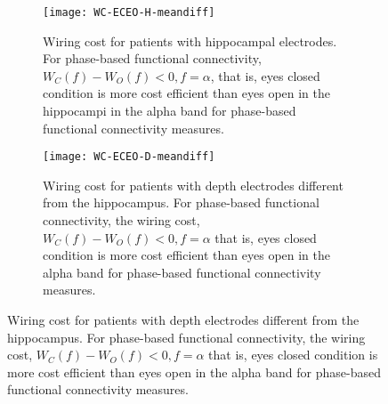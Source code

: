 \documentclass[11pt, onecolumn]{article}
\begin{document}
\begin{figure}[h] 
  \begin{subfigure}[t]{0.5\linewidth}
    \centering
    \texttt{[image: WC-ECEO-H-meandiff]} 
    \caption{Wiring cost for patients with hippocampal electrodes. For phase-based functional connectivity, $W_C(f) - W_O(f) <0, f = \alpha$, that is, eyes closed condition is more cost efficient than eyes open in the hippocampi in the alpha band for phase-based functional connectivity measures.} 
    \label{mesosfigi-2:a} 
  \end{subfigure}%
  \hspace{1ex}
  \begin{subfigure}[t]{0.5\linewidth}
    \centering
    \texttt{[image: WC-ECEO-D-meandiff]} 
    \caption{Wiring cost for patients with depth electrodes different from the hippocampus. For phase-based functional connectivity, the wiring cost, $W_C(f) - W_O(f) <0, f = \alpha$ that is, eyes closed condition is more cost efficient than eyes open in the alpha band for phase-based functional connectivity measures.} 
    \label{mesosfigi-2:b} 
  \end{subfigure} 
  

\end{figure}
\end{document}
